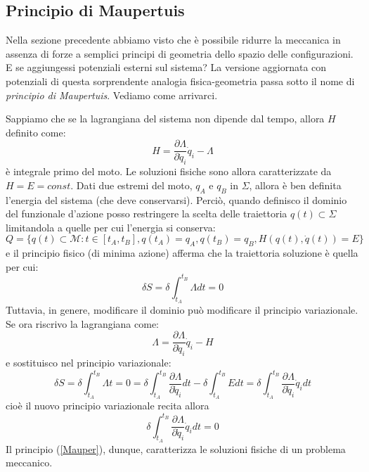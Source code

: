 \documentclass[a4paper,openany]{article}
\begin{document}
	\subsection{Principio di Maupertuis}
	Nella sezione precedente abbiamo visto che è possibile ridurre la meccanica in assenza di forze a semplici principi di geometria dello spazio delle configurazioni. E se aggiungessi potenziali esterni sul sistema? La versione aggiornata con potenziali di questa sorprendente analogia fisica-geometria passa sotto il nome di \textit{principio di Maupertuis}. Vediamo come arrivarci.
	
	Sappiamo che se la lagrangiana del sistema non dipende dal tempo, allora $H$ definito come:
	$$
	H = \dfrac{\partial \Lambda}{\partial \dot{q}_i}\dot{q}_i - \Lambda
	$$
	è integrale primo del moto. Le soluzioni fisiche sono allora caratterizzate da $H = E = const$. Dati due estremi del moto, $q_A$ e $q_B$ in $\Sigma$, allora è ben definita l'energia del sistema (che deve conservarsi). Perciò, quando definisco il dominio del funzionale d'azione posso restringere la scelta delle traiettoria $q(t) \subset \Sigma$ limitandola a quelle per cui l'energia si conserva:
	$$
	Q = \{q(t)\subset\mathcal{M}: t\in [t_A,t_B], q(t_A) = q_A, q(t_B)=q_B, H(q(t),\dot{q}(t)) = E\}
	$$
	e il principio fisico (di minima azione) afferma che la traiettoria soluzione è quella per cui:
	$$
	\delta S = \delta \int_{t_A}^{t_B}\Lambda dt = 0
	$$
	Tuttavia, in genere, modificare il dominio può modificare il principio variazionale. Se ora riscrivo la lagrangiana come:
	$$
	\Lambda = \dfrac{\partial \Lambda}{\partial \dot{q}_i}\dot{q}_i - H
	$$
	e sostituisco nel principio variazionale:
	\begin{equation}\label{key}
		\delta S = \delta \int_{t_A}^{t_B}\Lambda t = 0 = \delta \int_{t_A}^{t_B} \dfrac{\partial \Lambda}{\partial \dot{q}_i} dt -\delta \int_{t_A}^{t_B} E dt = \delta \int_{t_A}^{t_B} \dfrac{\partial \Lambda}{\partial \dot{q}_i} \dot{q}_idt
	\end{equation}
	cioè il nuovo principio variazionale recita allora
	\begin{equation}
		\delta \int_{t_A}^{t_B} \dfrac{\partial \Lambda}{\partial \dot{q}_i} \dot{q}_i dt = 0
		\label{Mauper}
	\end{equation}
	Il principio (\ref{Mauper}), dunque, caratterizza le soluzioni fisiche di un problema meccanico. 
	
\end{document}
